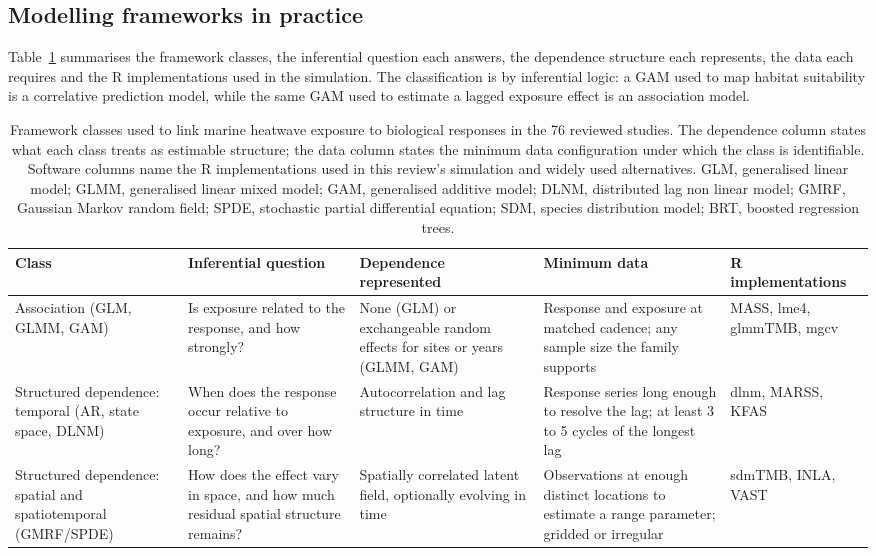 \subsection{Modelling frameworks in practice}\label{sec:frameworks}

Table~\ref{tab:frameworks} summarises the framework classes, the inferential question each answers, the dependence structure each represents, the data each requires and the R implementations used in the simulation. The classification is by inferential logic: a GAM used to map habitat suitability is a correlative prediction model, while the same GAM used to estimate a lagged exposure effect is an association model.

\begin{table}[H]
\centering
\caption{Framework classes used to link marine heatwave exposure to biological responses in the 76 reviewed studies. The dependence column states what each class treats as estimable structure; the data column states the minimum data configuration under which the class is identifiable. Software columns name the R implementations used in this review's simulation and widely used alternatives. GLM, generalised linear model; GLMM, generalised linear mixed model; GAM, generalised additive model; DLNM, distributed lag non linear model; GMRF, Gaussian Markov random field; SPDE, stochastic partial differential equation; SDM, species distribution model; BRT, boosted regression trees.}
\label{tab:frameworks}
\small
\setlength{\tabcolsep}{4pt}\begin{tabular}{p{2.5cm}p{3.3cm}p{3.0cm}p{3.2cm}p{2.6cm}}
\toprule
Class & Inferential question & Dependence represented & Minimum data & R implementations \\
\midrule
Association (GLM, GLMM, GAM) & Is exposure related to the response, and how strongly? & None (GLM) or exchangeable random effects for sites or years (GLMM, GAM) & Response and exposure at matched cadence; any sample size the family supports & MASS, lme4, glmmTMB, mgcv \\
\addlinespace
Structured dependence: temporal (AR, state space, DLNM) & When does the response occur relative to exposure, and over how long? & Autocorrelation and lag structure in time & Response series long enough to resolve the lag; at least 3 to 5 cycles of the longest lag & dlnm, MARSS, KFAS \\
\addlinespace
Structured dependence: spatial and spatiotemporal (GMRF\slash SPDE) & How does the effect vary in space, and how much residual spatial structure remains? & Spatially correlated latent field, optionally evolving in time & Observations at enough distinct locations to estimate a range parameter; gridded or irregular & sdmTMB, INLA, VAST \\

\end{tabular}
\end{table}
